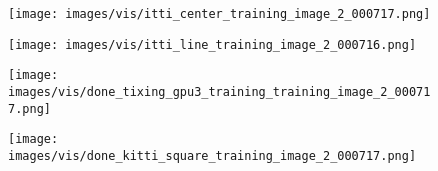 \documentclass[10pt,twocolumn,letterpaper]{article}
\begin{document}
\begin{figure*}[t]
  \centering
    \begin{subfigure}[b]{0.23\textwidth}
  \texttt{[image: images/vis/itti\_center\_training\_image\_2\_000717.png]}
    \end{subfigure}%
    \begin{subfigure}[b]{0.23\textwidth}
  \texttt{[image: images/vis/itti\_line\_training\_image\_2\_000716.png]}
    \end{subfigure}%
    \begin{subfigure}[b]{0.23\textwidth}
  \texttt{[image: images/vis/done\_tixing\_gpu3\_training\_training\_image\_2\_000717.png]}
    \end{subfigure}%
    \begin{subfigure}[b]{0.23\textwidth}
  \texttt{[image: images/vis/done\_kitti\_square\_training\_image\_2\_000717.png]}
    \end{subfigure}%


\end{figure*}
\end{document}
